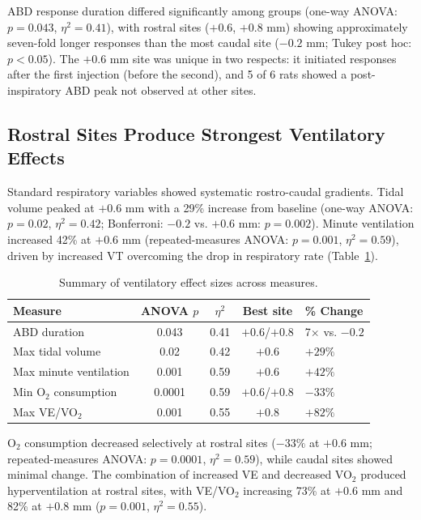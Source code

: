 \documentclass[12pt]{article}
\begin{document}
ABD response duration differed significantly among groups (one-way ANOVA: $p = 0.043$, $\eta^2 = 0.41$), with rostral sites ($+0.6$, $+0.8$ mm) showing approximately seven-fold longer responses than the most caudal site ($-0.2$ mm; Tukey post hoc: $p < 0.05$). The $+0.6$ mm site was unique in two respects: it initiated responses after the first injection (before the second), and 5 of 6 rats showed a post-inspiratory ABD peak not observed at other sites.

\subsection{Rostral Sites Produce Strongest Ventilatory Effects}

Standard respiratory variables showed systematic rostro-caudal gradients. Tidal volume peaked at $+0.6$ mm with a 29\% increase from baseline (one-way ANOVA: $p = 0.02$, $\eta^2 = 0.42$; Bonferroni: $-0.2$ vs. $+0.6$ mm: $p = 0.002$). Minute ventilation increased 42\% at $+0.6$ mm (repeated-measures ANOVA: $p = 0.001$, $\eta^2 = 0.59$), driven by increased VT overcoming the drop in respiratory rate (Table~\ref{tab:ventilation}).

\begin{table}[htbp]
\centering
\caption{Summary of ventilatory effect sizes across measures.}
\label{tab:ventilation}
\begin{tabular}{lcccl}
\toprule
Measure & ANOVA $p$ & $\eta^2$ & Best site & \% Change \\
\midrule
ABD duration & 0.043 & 0.41 & $+0.6$/$+0.8$ & 7$\times$ vs. $-0.2$ \\
Max tidal volume & 0.02 & 0.42 & $+0.6$ & $+29\%$ \\
Max minute ventilation & 0.001 & 0.59 & $+0.6$ & $+42\%$ \\
Min O$_2$ consumption & 0.0001 & 0.59 & $+0.6$/$+0.8$ & $-33\%$ \\
Max VE/VO$_2$ & 0.001 & 0.55 & $+0.8$ & $+82\%$ \\
\bottomrule
\end{tabular}
\end{table}

O$_2$ consumption decreased selectively at rostral sites ($-33\%$ at $+0.6$ mm; repeated-measures ANOVA: $p = 0.0001$, $\eta^2 = 0.59$), while caudal sites showed minimal change. The combination of increased VE and decreased VO$_2$ produced hyperventilation at rostral sites, with VE/VO$_2$ increasing 73\% at $+0.6$ mm and 82\% at $+0.8$ mm ($p = 0.001$, $\eta^2 = 0.55$).
\end{document}
